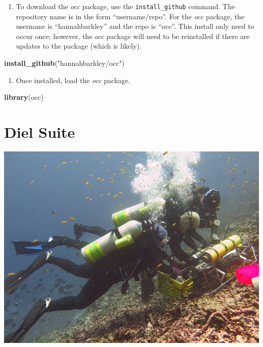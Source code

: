 \documentclass[]{book}
\newenvironment{Shaded}{\begin{snugshade}}{\end{snugshade}}
\newcommand{\KeywordTok}[1]{\textcolor[rgb]{0.13,0.29,0.53}{\textbf{#1}}}
\newcommand{\NormalTok}[1]{#1}
\newcommand{\StringTok}[1]{\textcolor[rgb]{0.31,0.60,0.02}{#1}}
\providecommand{\tightlist}{%
  \setlength{\itemsep}{0pt}\setlength{\parskip}{0pt}}
\begin{document}
\begin{enumerate}
\def\labelenumi{\arabic{enumi}.}
\setcounter{enumi}{1}
\tightlist
\item
  To download the \emph{occ} package, use the \texttt{install\_github} command. The repository name is in the form ``username/repo''. For the \emph{occ} package, the username is ``hannahbarkley'' and the repo is ``occ''. This install only need to occur once; however, the \emph{occ} package will need to be reinstalled if there are updates to the package (which is likely).
\end{enumerate}

\begin{Shaded}
\begin{Highlighting}[]
\KeywordTok{install_github}\NormalTok{(}\StringTok{"hannahbarkley/occ"}\NormalTok{)}
\end{Highlighting}
\end{Shaded}

\begin{enumerate}
\def\labelenumi{\arabic{enumi}.}
\setcounter{enumi}{2}
\tightlist
\item
  Once installed, load the \emph{occ} package.
\end{enumerate}

\begin{Shaded}
\begin{Highlighting}[]
\KeywordTok{library}\NormalTok{(occ)}
\end{Highlighting}
\end{Shaded}

\hypertarget{dielsuite}{%
\chapter{Diel Suite}\label{dielsuite}}

\includegraphics{images/d_suite_deploy_small.jpg}
\end{document}
